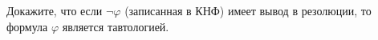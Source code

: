 Докажите, что если $\neg \varphi$ (записанная в КНФ) имеет вывод в резолюции, то формула $\varphi$
является тавтологией.
